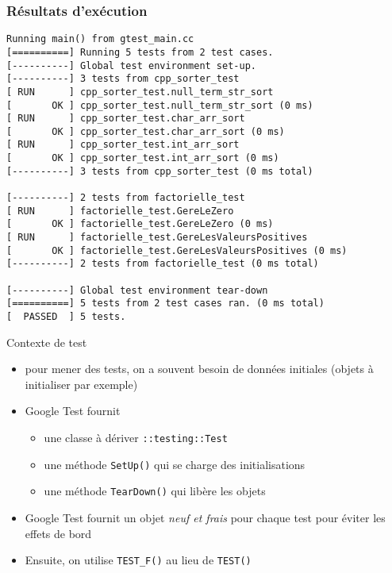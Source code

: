 \begin{frame}[fragile]
\frametitle{Résultats d'exécution}
{\tiny
\begin{verbatim}
Running main() from gtest_main.cc
[==========] Running 5 tests from 2 test cases.
[----------] Global test environment set-up.
[----------] 3 tests from cpp_sorter_test
[ RUN      ] cpp_sorter_test.null_term_str_sort
[       OK ] cpp_sorter_test.null_term_str_sort (0 ms)
[ RUN      ] cpp_sorter_test.char_arr_sort
[       OK ] cpp_sorter_test.char_arr_sort (0 ms)
[ RUN      ] cpp_sorter_test.int_arr_sort
[       OK ] cpp_sorter_test.int_arr_sort (0 ms)
[----------] 3 tests from cpp_sorter_test (0 ms total)

[----------] 2 tests from factorielle_test
[ RUN      ] factorielle_test.GereLeZero
[       OK ] factorielle_test.GereLeZero (0 ms)
[ RUN      ] factorielle_test.GereLesValeursPositives
[       OK ] factorielle_test.GereLesValeursPositives (0 ms)
[----------] 2 tests from factorielle_test (0 ms total)

[----------] Global test environment tear-down
[==========] 5 tests from 2 test cases ran. (0 ms total)
[  PASSED  ] 5 tests.
\end{verbatim}
}
\end{frame}

\begin{frame}{Contexte de test}

\begin{itemize}
\itemsep1pt\parskip0pt
\item
  pour mener des tests, on a souvent besoin de données initiales (objets
  à initialiser par exemple)
\item
  Google Test fournit

  \begin{itemize}
  \itemsep1pt\parskip0pt
  \item
    une classe à dériver \texttt{::testing::Test}
  \item
    une méthode \texttt{SetUp()} qui se charge des initialisations
  \item
    une méthode \texttt{TearDown()} qui libère les objets
  \end{itemize}
\item
  Google Test fournit un objet \emph{neuf et frais} pour chaque test
  pour éviter les effets de bord
  \item Ensuite, on utilise \texttt{TEST\_F()} au lieu de \texttt{TEST()}
\end{itemize}

\end{frame}

